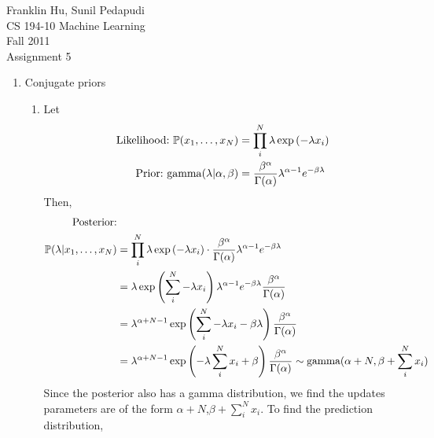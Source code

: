 \documentclass{article}
\begin{document}
Franklin Hu, Sunil Pedapudi \\
CS 194-10 Machine Learning \\
Fall 2011 \\
Assignment 5 \\

\newcommand{\pr}{\mathbb{P}}
\newcommand{\tab}{\hspace*{2em}}

\begin{enumerate}
    \item Conjugate priors %
        \begin{enumerate}
            \item %
                Let
                \begin{align*}
                    \textnormal{Likelihood:\ } \pr(x_1,\hdots,x_N) &=
                        \prod_i^N\lambda\exp\left(-\lambda x_i\right)\\
                    \textnormal{Prior:\ } \mathrm{gamma}(\lambda|\alpha,\beta) &=
                        \frac{\beta^\alpha}{\Gamma(\alpha)}\lambda^{\alpha-1}e^{-\beta\lambda}
                \end{align*}
                Then,
                \begin{align*}
                    \textnormal{Posterior:}\\
                    \pr(\lambda|x_1,\hdots,x_N) &=
                        \prod_i^N\lambda\exp\left(-\lambda x_i\right)\cdot
                        \frac{\beta^\alpha}{\Gamma(\alpha)}
                        \lambda^{\alpha-1}e^{-\beta\lambda}\\
                    &=  \lambda \exp\left(\sum_i^N -\lambda x_i\right)
                        \lambda^{\alpha-1}e^{-\beta\lambda}
                        \frac{\beta^\alpha}{\Gamma(\alpha)}\\
                    &=  \lambda^{\alpha+N-1}\exp\left(\sum_i^N -\lambda x_i - \beta\lambda\right)
                        \frac{\beta^\alpha}{\Gamma(\alpha)}\\
                    &=  \lambda^{\alpha+N-1}\exp\left(-\lambda\sum_i^Nx_i + \beta\right)
                        \frac{\beta^\alpha}{\Gamma(\alpha)}
                        \sim \textnormal{gamma}(\alpha+N,\beta+\sum_i^Nx_i)
                \end{align*}
                Since the posterior also has a gamma distribution, we find the
                updates parameters are of the form \(\alpha+N\),\(\beta+\sum_i^Nx_i\).
                To find the prediction distribution,

\end{enumerate}
\end{enumerate}
\end{document}
